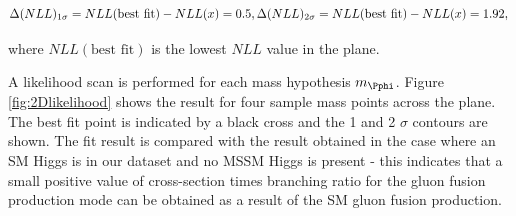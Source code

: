 \begin{equation}
\Delta(NLL)_{1\sigma} = NLL(\text{best fit}) - NLL(x) = 0.5 ,\\ 
\Delta(NLL)_{2\sigma} = NLL(\text{best fit}) - NLL(x) = 1.92 ,\\ 
\end{equation}

where $NLL(\text{best fit})$ is the lowest $NLL$ value in the plane.

A likelihood scan is performed for each mass hypothesis $m_{\Pphi}$. Figure
\ref{fig:2Dlikelihood} shows the result for four sample mass points across the
plane. The best fit point is indicated by a black cross and the 1 and 2 $\sigma$
contours are shown. The fit result is compared with the result obtained in the
case where an \ac{SM} Higgs is in our dataset and no \ac{MSSM} Higgs is present
- this indicates that a small positive value of cross-section times branching
ratio for the gluon fusion production mode can be obtained as a result of the
\ac{SM} gluon fusion production.

